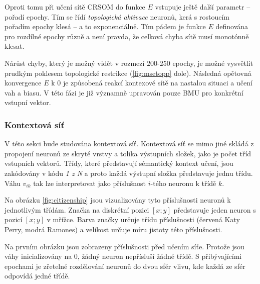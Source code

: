 \documentclass[thesis=M,czech]{FITthesis}[2012/06/26]
\begin{document}
Oproti tomu při učení sítě CRSOM do funkce $E$ vstupuje ještě další parametr -- pořadí epochy. Tím se řídí \textit{topologická aktivace} neuronů, kerá s rostoucím pořadím epochy klesá -- a to exponenciálně. Tím pádem je funkce $E$ definována pro rozdílné epochy různě a není pravda, že celková chyba sítě musí monotónně klesat.


Nárůst chyby, který je možný vidět  v rozmezí $200$-$250$ epochy, je možné vysvětlit prudkým poklesem topologické restrikce (\ref{fig:msetopp} dole). Následná opětovná konvergence $E$ k 0 je způsobená reakcí kontexové sítě na nastalou situaci a učení vah a biasu. V této fázi je již významně upravován pouze BMU pro konkrétní vstupní vektor.



\subsubsection*{Kontextová síť}
V této sekci bude studována kontextová síť. Kontextová síť se mimo jiné skládá z propojení neuronů ze skryté vrstvy a tolika výstupních složek, jako je počet tříd vstupních vektorů. Třídy, které představují sémantický kontext učení, jsou zakódovány v kódu \textit{1 z N} a proto každá výstupní složka představuje jednu třídu. Váhu  $v_{ik}$ tak lze interpretovat jako příslušnost $i$-tého neuronu k třídě $k$. 

Na obrázku \ref{fig:citizenship} jsou vizualizovány tyto příslušnosti neuronů k jednotlivým třídám. Značka na diskrétní pozici $[x;y]$ představuje jeden neuron s pozicí $[x;y]$ v mřížce. Barva značky určuje třídu příslušnosti (červená Katy Perry, modrá Ramones) a velikost určuje míru jistoty této příslušnosti.

Na prvním obrázku jsou zobrazeny příslušnosti před učením síťe. Protože jsou váhy inicializovány na $0$, žádný neuron nepřísluší žádné třídě. S přibývajícími epochami je zřetelné rozdělování neuronů do dvou sfér vlivu, kde každá ze sfér odpovídá jedné třídě. 
\end{document}
